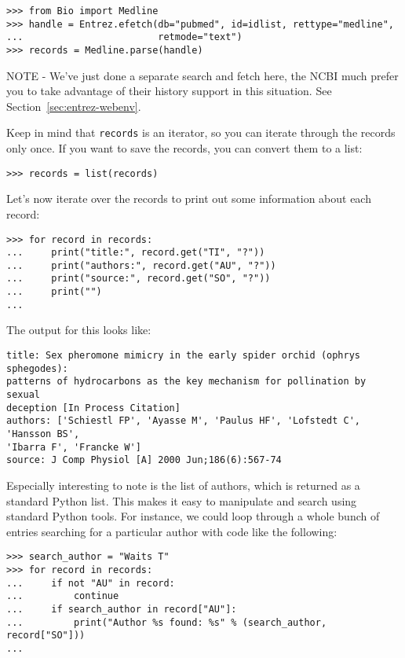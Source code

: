 \begin{verbatim}
>>> from Bio import Medline
>>> handle = Entrez.efetch(db="pubmed", id=idlist, rettype="medline",
...                        retmode="text")
>>> records = Medline.parse(handle)
\end{verbatim}

NOTE - We've just done a separate search and fetch here, the NCBI much prefer you to take advantage of their history support in this situation.  See Section~\ref{sec:entrez-webenv}.

Keep in mind that \verb+records+ is an iterator, so you can iterate through the records only once. If you want to save the records, you can convert them to a list:

\begin{verbatim}
>>> records = list(records)
\end{verbatim}

Let's now iterate over the records to print out some information about each record:
\begin{verbatim}
>>> for record in records:
...     print("title:", record.get("TI", "?"))
...     print("authors:", record.get("AU", "?"))
...     print("source:", record.get("SO", "?"))
...     print("")
...
\end{verbatim}

The output for this looks like:
\begin{verbatim}
title: Sex pheromone mimicry in the early spider orchid (ophrys sphegodes):
patterns of hydrocarbons as the key mechanism for pollination by sexual
deception [In Process Citation]
authors: ['Schiestl FP', 'Ayasse M', 'Paulus HF', 'Lofstedt C', 'Hansson BS',
'Ibarra F', 'Francke W']
source: J Comp Physiol [A] 2000 Jun;186(6):567-74
\end{verbatim}

Especially interesting to note is the list of authors, which is returned as a standard Python list. This makes it easy to manipulate and search using standard Python tools. For instance, we could loop through a whole bunch of entries searching for a particular author with code like the following:
\begin{verbatim}
>>> search_author = "Waits T"
>>> for record in records:
...     if not "AU" in record:
...         continue
...     if search_author in record["AU"]:
...         print("Author %s found: %s" % (search_author, record["SO"]))
...
\end{verbatim}

